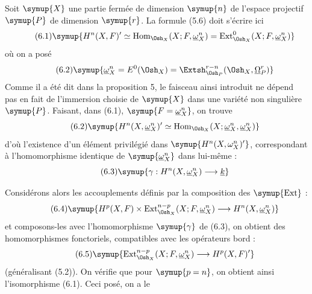 Soit $\symup{X}$ une partie fermée de dimension $\symup{n}$ de l'espace projectif $\symup{P}$ de
dimension $\symup{r}$. La formule (5.6) doit s'écrire ici
\begin{equation}\tag{6.1}
  \symup{H^{n}(X,F)'
  \simeq\operatorname{Hom}_{\Osh_X}(X;F,\underline{\omega}_X^{n})
  =\operatorname{Ext}_{\Osh_X}^{0}(X;F,\underline{\omega}_X^{n})}
\end{equation}
où on a posé
\begin{equation}\tag{6.2}
  \symup{\underline{\omega}_X^{n}=E^{0}(\Osh_X)
  =\Extsh_{\Osh_P}^{r-n}(\Osh_X,\underline{\Omega}_P^{r})}
\end{equation}
Comme il a été dit dans la proposition 5, le faisceau ainsi introduit ne dépend
pas en fait de l'immersion choisie de $\symup{X}$ dans une variété non singulière $\symup{P}$.
Faisant, dans (6.1), $\symup{F=\underline{\omega}_X^{n}}$, on trouve
\begin{equation}\tag{6.2}
  \symup{H^{n}(X,\underline{\omega}_X^{n})'
  \simeq\operatorname{Hom}_{\Osh_X}(X;\underline{\omega}_X^{n},\underline{\omega}_X^{n})}
\end{equation}
 d'où l'existence d'un élément
privilégié dans $\symup{H^{n}(X,\omega_X^{n})'}$, correspondant à l'homomorphisme
identique de $\symup{\underline{\omega}_X^{n}}$ dans lui-même :
\begin{equation}\tag{6.3}
  \symup{\gamma:H^{n}(X,\underline{\omega}_X^{n})\longrightarrow\underline{k}}
\end{equation}

Considérons alors les accouplements définis par la composition des $\symup{\operatorname{Ext}}$ :
\begin{equation}\tag{6.4}
  \symup{H^{p}(X,F)\times
  \operatorname{Ext}_{\Osh_X}^{n-p}(X;F,\underline{\omega}_X^{n})
  \longrightarrow H^{n}(X,\underline{\omega}_X^{n})}
\end{equation}
et composons-les avec l'homomorphisme $\symup{\gamma}$ de (6.3), on obtient des
homomorphismes fonctoriels, compatibles avec les opérateurs bord :
\begin{equation}\tag{6.5}
  \symup{\operatorname{Ext}_{\Osh_X}^{n-p}(X;F,\underline{\omega}_X^{n})
  \longrightarrow H^{p}(X,F)'}
\end{equation}
(généralisant (5.2)). On vérifie que pour $\symup{p=n}$, on obtient ainsi
l'isomorphisme (6.1). Ceci posé, on a le

